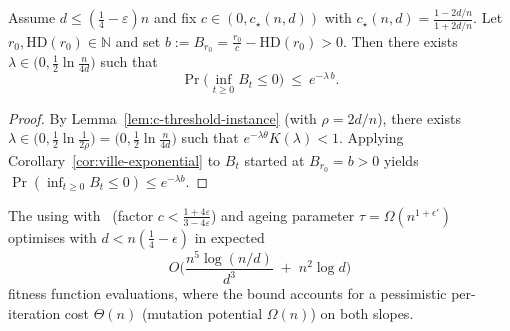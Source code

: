 \documentclass[lettersize,journal]{IEEEtran}
\newcommand{\HD}{\text{HD}}
\begin{document}
\begin{lemma}
	\label{lem:param-constant-c-general}
	Assume $d\le(\tfrac14-\varepsilon)n$ and fix $c\in(0,c_\star(n,d))$ with 
	$c_\star(n,d)=\frac{1-2d/n}{1+2d/n}$.
	Let $r_0,\HD(r_0)\in\mathbb{N}$ and set $b:=B_{r_0}=\frac{r_0}{c}-\HD(r_0)>0$.
	Then there exists $\lambda\in\big(0,\tfrac12\ln\frac{n}{4d}\big)$ such that
	\[
	\Pr\!\big(\inf_{t\ge 0} B_t \le 0\big)\ \le\ e^{-\lambda\,b}.
	\]
\end{lemma}
\begin{proof}
	By Lemma~\ref{lem:c-threshold-instance} (with $\rho=2d/n$), there exists
	$\lambda\in\big(0,\tfrac12\ln\tfrac{1}{2\rho}\big)=\big(0,\tfrac12\ln\tfrac{n}{4d}\big)$
	such that $e^{-\lambda\theta}K(\lambda)<1$. Applying Corollary~\ref{cor:ville-exponential}
	to $B_t$ started at $B_{r_0}=b>0$ yields
	$\Pr(\inf_{t\ge 0} B_t\le 0)\le e^{-\lambda b}$.
\end{proof}


\begin{theorem}\label{th:expoHD-cliff}
	The {\oneoneOPTIA} using \IPHfcm{} with \linHD\ (factor $c<\tfrac{1+4\varepsilon}{3-4\varepsilon}$) and ageing parameter $\tau=\Omega(n^{1+\epsilon'})$
	optimises \cliff{} with $d<n(\tfrac{1}{4}-\epsilon)$ in expected
	\[
	O\!\Big(\frac{n^{5}\log(n/d)}{d^{3}} \;+\; n^{2}\log d\Big)
	\]
	fitness function evaluations, where the bound accounts for a pessimistic per-iteration cost $\Theta(n)$ (mutation potential $\Omega(n)$) on both slopes.
\end{theorem}
\end{document}
